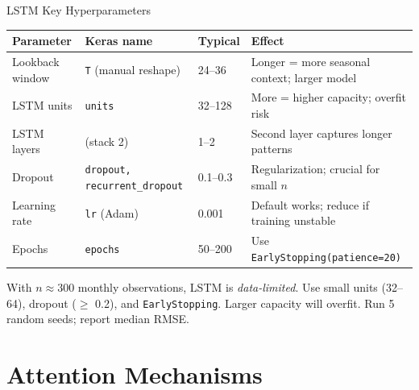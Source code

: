 \documentclass[aspectratio=169, 10pt]{beamer}
\begin{document}
\begin{frame}{LSTM Key Hyperparameters}
  \begin{center}
  \footnotesize
  \begin{tabular}{p{2.6cm}p{2.8cm}p{1.6cm}p{4.0cm}}
    \toprule
    \textbf{Parameter} & \textbf{Keras name} & \textbf{Typical} & \textbf{Effect} \\
    \midrule
    Lookback window
      & \texttt{T} (manual reshape)
      & 24--36
      & Longer = more seasonal context; larger model \\
    LSTM units
      & \texttt{units}
      & 32--128
      & More = higher capacity; overfit risk \\
    LSTM layers
      & (stack 2)
      & 1--2
      & Second layer captures longer patterns \\
    Dropout
      & \texttt{dropout,} \texttt{recurrent\_dropout}
      & 0.1--0.3
      & Regularization; crucial for small $n$ \\
    Learning rate
      & \texttt{lr} (Adam)
      & 0.001
      & Default works; reduce if training unstable \\
    Epochs
      & \texttt{epochs}
      & 50--200
      & Use \texttt{EarlyStopping(patience=20)} \\
    \bottomrule
  \end{tabular}
  \end{center}

  \medskip
  \begin{keybox}
    \footnotesize
    With $n \approx 300$ monthly observations, LSTM is
    \emph{data-limited}. Use small units (32--64), dropout ($\geq$ 0.2),
    and \texttt{EarlyStopping}. Larger capacity will overfit.
    Run 5 random seeds; report median RMSE.
  \end{keybox}

\end{frame}

\section{Attention Mechanisms}
\end{document}

